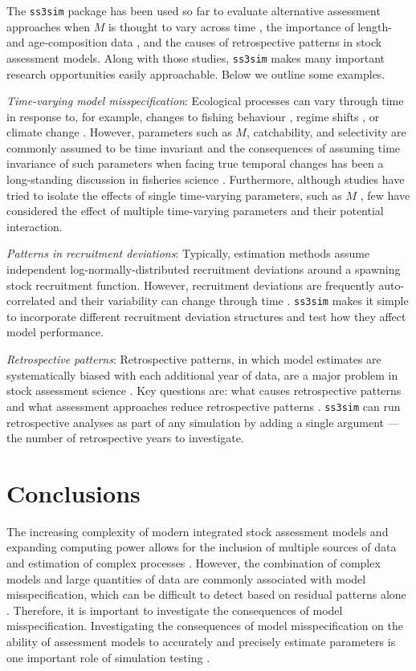 \documentclass[11pt]{article}
\begin{document}
The \texttt{ss3sim} package has been used so far to evaluate alternative assessment approaches when $M$ is thought to vary across time \cite{johnson2013}, the importance of length- and age-composition data \cite{ono2013}, and the causes of retrospective patterns in stock assessment models. Along with those studies, \texttt{ss3sim} makes many important research opportunities easily approachable. Below we outline some examples.

\emph{Time-varying model misspecification}: Ecological processes can vary through time in response to, for example, changes to fishing behaviour \cite{hilborn1992}, regime shifts \cite{vert-pre2013}, or climate change \cite{walther2002}. However, parameters such as $M$, catchability, and selectivity are commonly assumed to be time invariant and the consequences of assuming time invariance of such parameters when facing true temporal changes has been a long-standing discussion in fisheries science \cite{royama1992, wilberg2006, fu2001}. Furthermore, although studies have tried to isolate the effects of single time-varying parameters, such as $M$ \cite{lee2011, jiao2012, deroba2013, johnson2013}, few have considered the effect of multiple time-varying parameters and their potential interaction.

\emph{Patterns in recruitment deviations}: Typically, estimation methods assume independent log-normally-distributed recruitment deviations around a spawning stock recruitment function. However, recruitment deviations are frequently auto-correlated and their variability can change through time \cite{beamish1995, pyper1998}. \texttt{ss3sim} makes it simple to incorporate different recruitment deviation structures and test how they affect model performance.

\emph{Retrospective patterns}: Retrospective patterns, in which model estimates are systematically biased with each additional year of data, are a major problem in stock assessment science \cite{mohn1999, legault2008}. Key questions are: what causes retrospective patterns and what assessment approaches reduce retrospective patterns \cite{legault2008}. \texttt{ss3sim} can run retrospective analyses as part of any simulation by adding a single argument --- the number of retrospective years to investigate.

\section*{Conclusions}

The increasing complexity of modern integrated stock assessment models and expanding computing power allows for the inclusion of multiple sources of data and estimation of complex processes \cite{maunder2013}. However, the combination of complex models and large quantities of data are commonly associated with model misspecification, which can be difficult to detect based on residual patterns alone \cite{maunder2013}. Therefore, it is important to investigate the consequences of model misspecification. Investigating the consequences of model misspecification on the ability of assessment models to accurately and precisely estimate parameters is one important role of simulation testing \cite{wilberg2006, deroba2013a, crone2013}.
\end{document}
